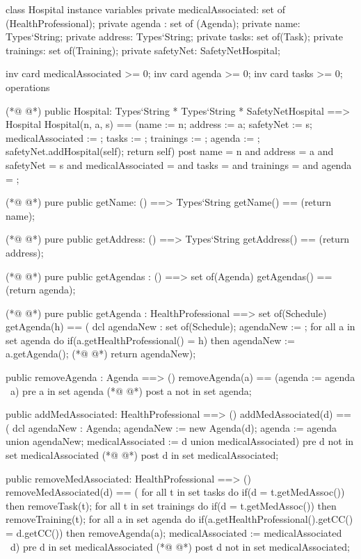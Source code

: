 \begin{vdmpp}[breaklines=true]
class Hospital
instance variables
  private medicalAssociated: set of (HealthProfessional);
  private agenda : set of (Agenda);
  private name: Types`String;
  private address: Types`String;
  private tasks: set of(Task);
  private trainings: set of(Training);
  private safetyNet: SafetyNetHospital;
 
 inv card medicalAssociated >= 0;
 inv card agenda >= 0;
 inv card tasks >= 0;
operations

(*@
\label{Hospital:16}
@*)
 public Hospital: Types`String * Types`String * SafetyNetHospital ==> Hospital
  Hospital(n, a, s) == (name := n; address := a; safetyNet := s; medicalAssociated := {}; tasks := {}; trainings := {}; agenda := {};
  safetyNet.addHospital(self); return self)
 post name = n and address = a and safetyNet = s and medicalAssociated = {} and tasks = {} and trainings = {} and agenda = {};
 
(*@
\label{getName:21}
@*)
 pure public getName: () ==> Types`String
  getName() == (return name);
 
(*@
\label{getAddress:24}
@*)
 pure public getAddress: () ==> Types`String
  getAddress() == (return address);
 
(*@
\label{getAgendas:27}
@*)
 pure public getAgendas : () ==> set of(Agenda)
  getAgendas() == (return agenda);
  
(*@
\label{getAgenda:30}
@*)
 pure public getAgenda : HealthProfessional ==> set of(Schedule)
  getAgenda(h) == (
   dcl agendaNew : set of(Schedule);
   agendaNew := {};
   for all a in set agenda do
    if(a.getHealthProfessional() = h)
     then agendaNew := a.getAgenda();
(*@
\label{removeAgenda:37}
@*)
   return agendaNew);
 
 public removeAgenda : Agenda ==> ()
  removeAgenda(a) == (agenda := agenda \ {a})
 pre a in set agenda
(*@
\label{addMedAssociated:42}
@*)
 post a not in set agenda;
 
 public addMedAssociated: HealthProfessional ==> ()
  addMedAssociated(d) == (
   dcl agendaNew : Agenda;
   agendaNew := new Agenda(d);
   agenda := agenda union {agendaNew};
   medicalAssociated := {d} union medicalAssociated)
 pre d not in set medicalAssociated
(*@
\label{removeMedAssociated:51}
@*)
 post d in set medicalAssociated;
  
 public removeMedAssociated: HealthProfessional ==> ()
  removeMedAssociated(d) == (
   for all t in set tasks do
    if(d = t.getMedAssoc())
     then removeTask(t);
   for all t in set trainings do
    if(d = t.getMedAssoc())
     then removeTraining(t);
   for all a in set agenda do
    if(a.getHealthProfessional().getCC() = d.getCC())
     then removeAgenda(a);
   medicalAssociated := medicalAssociated \ {d})
 pre d in set medicalAssociated
(*@
\label{addTask:66}
@*)
 post d not in set medicalAssociated;
 

\end{vdmpp}
